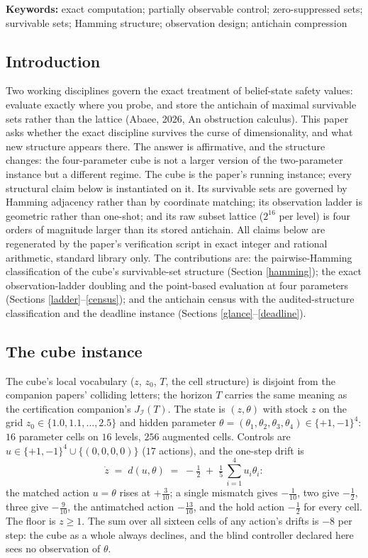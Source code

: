 \documentclass[10pt,twocolumn]{article}
\theoremstyle{plain}
\theoremstyle{definition}
\theoremstyle{remark}
\begin{document}
\textbf{Keywords:} exact computation; partially observable control;
zero-suppressed sets; survivable sets; Hamming structure; observation
design; antichain compression

\subsection{Introduction}\label{introduction}

Two working disciplines govern the exact treatment of belief-state safety values: evaluate exactly where you probe, and store the antichain of maximal survivable sets rather than the lattice (Abaee, 2026, An obstruction calculus). This paper asks whether the exact discipline survives the curse of dimensionality, and what new structure appears there. The answer is affirmative, and the structure changes: the four-parameter cube is not a larger version of the two-parameter instance but a different regime. The cube is the paper's running instance; every structural claim below is instantiated on it.
Its survivable sets are governed by Hamming adjacency rather than by
coordinate matching; its observation ladder is geometric rather than
one-shot; and its raw subset lattice (\(2^{16}\) per level) is four
orders of magnitude larger than its stored antichain. All claims below
are regenerated by the paper's verification script in exact integer
and rational arithmetic, standard library only. The contributions are:
the pairwise-Hamming classification of the cube's survivable-set
structure (Section \ref{hamming}); the exact observation-ladder
doubling and the point-based evaluation at four parameters (Sections
\ref{ladder}--\ref{census}); and the antichain census with the
audited-structure classification and the deadline instance (Sections
\ref{glance}--\ref{deadline}).

\subsection{The cube instance}\label{instance}

The cube's local vocabulary (\(z\), \(z_{0}\), \(T\), the cell
structure) is disjoint from the companion papers' colliding letters;
the horizon \(T\) carries the same meaning as the certification
companion's \(J_{\mathcal{I}}(T)\). The state is \((z, \theta)\) with stock \(z\) on the grid
\(z_{0} \in \{1.0, 1.1, \dots, 2.5\}\) and hidden parameter
\(\theta = (\theta_{1}, \theta_{2}, \theta_{3}, \theta_{4}) \in
\{+1, -1\}^{4}\): \(16\) parameter cells on \(16\) levels, \(256\)
augmented cells. Controls are \(u \in \{+1,-1\}^{4} \cup \{(0,0,0,0)\}\)
(\(17\) actions), and the one-step drift is
\[
\dot z \;=\; d(u, \theta) \;=\; -\tfrac12
\;+\; \tfrac15\,\textstyle\sum_{i=1}^{4} u_{i}\theta_{i}:
\]
the matched action \(u = \theta\) rises at \(+\tfrac3{10}\); a single
mismatch gives \(-\tfrac1{10}\), two give \(-\tfrac12\), three give
\(-\tfrac9{10}\), the antimatched action \(-\tfrac{13}{10}\), and the
hold action \(-\tfrac12\) for every cell. The floor is \(z \ge 1\).
The sum over all sixteen cells of any action's drifts is \(-8\) per
step: the cube as a whole always declines, and the blind controller
declared here sees no observation of \(\theta\).
\end{document}
